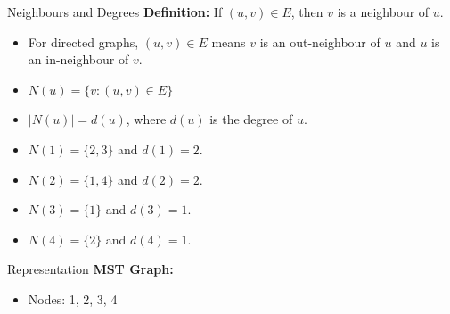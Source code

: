 \documentclass{beamer}
\begin{document}
\begin{frame}{Neighbours and Degrees}
    \textbf{Definition:} If $(u, v) \in E$, then $v$ is a neighbour of $u$.
    \begin{itemize}
        \item For directed graphs, $(u, v) \in E$ means $v$ is an out-neighbour of $u$ and $u$ is an in-neighbour of $v$.
        \item $N(u) = \{v: (u,v) \in E\}$
        \item $|N(u)| = d(u)$, where $d(u)$ is the degree of $u$.
    \end{itemize}

    \centering

    \begin{itemize}
        \item $N(1) = \{2, 3\}$ and $d(1) = 2$.
        \item $N(2) = \{1, 4\}$ and $d(2) = 2$.
        \item $N(3) = \{1\}$ and $d(3) = 1$.
        \item $N(4) = \{2\}$ and $d(4) = 1$.
    \end{itemize}
\end{frame}

\begin{frame}{Representation}
    \textbf{MST Graph:}
    \begin{itemize}
        \item Nodes: 1, 2, 3, 4
    \end{itemize}
\end{frame}
\end{document}
